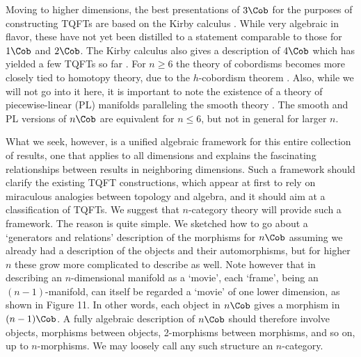 Moving to higher dimensions, the best presentations of $3\Cob$ for the
purposes of constructing TQFTs are based on the Kirby calculus
\cite{Kerler,RT,SawinTQFT}.  While very algebraic in flavor, these
have not yet been distilled to a statement comparable to
those for $1\Cob$ and $2\Cob$.  The Kirby calculus also gives a
description of $4\Cob$ which has yielded a few TQFTs so far
\cite{Broda,Kirby}.  For $n \ge 6$ the theory of cobordisms becomes more
closely tied to homotopy theory, due to the $h$-cobordism theorem
\cite{Milnor}.  Also, while we will not go into it here, it is important
to note the existence of a theory of piecewise-linear (PL) manifolds
paralleling the smooth theory \cite{BW,CFS,CKY,FHK,Pachner}.  The
smooth and PL versions of $n\Cob$ are equivalent for $n \le 6$, but
not in general for larger $n$.

What we seek, however, is a unified algebraic framework for this
entire collection of results, one that applies to all dimensions
and explains the fascinating relationships between results in
neighboring dimensions.  Such a framework should clarify the
existing TQFT constructions, which appear at first to rely on
miraculous analogies between topology and algebra, and it should
aim at a classification of TQFTs.   We suggest that
$n$-category theory will provide such a framework.  The reason is
quite simple.  We sketched how to go about a `generators and
relations' description of the morphisms for $n\Cob$ assuming
we already had a description of the objects and their automorphisms, but
for higher $n$ these grow more complicated to describe as well.
Note however that in describing an $n$-dimensional manifold as a
`movie', each `frame', being an $(n-1)$-manifold, can itself be
regarded a `movie' of one lower dimension, as shown in Figure 11.
In other words, each object in $n\Cob$ gives a morphism in
$(n-1)\Cob$.   A fully algebraic description of $n\Cob$ should
therefore involve objects, morphisms between objects, 2-morphisms
between morphisms, and so on, up to $n$-morphisms.  We may
loosely call any such structure an $n$-category.

